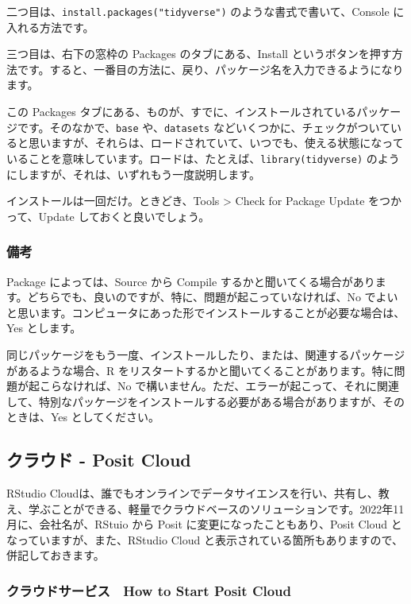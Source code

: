 \documentclass[
]{bxjsbook}
\theoremstyle{definition}
\theoremstyle{definition}
\theoremstyle{definition}
\theoremstyle{definition}
\theoremstyle{remark}
\begin{document}
二つ目は、\texttt{install.packages("tidyverse")} のような書式で書いて、Console に入れる方法です。

三つ目は、右下の窓枠の Packages のタブにある、Install というボタンを押す方法です。すると、一番目の方法に、戻り、パッケージ名を入力できるようになります。

この Packages タブにある、ものが、すでに、インストールされているパッケージです。そのなかで、\texttt{base} や、\texttt{datasets} などいくつかに、チェックがついていると思いますが、それらは、ロードされていて、いつでも、使える状態になっていることを意味しています。ロードは、たとえば、\texttt{library(tidyverse)} のようにしますが、それは、いずれもう一度説明します。

インストールは一回だけ。ときどき、Tools \textgreater{} Check for Package Update をつかって、Update しておくと良いでしょう。

\hypertarget{ux5099ux8003}{%
\subsubsection{備考}\label{ux5099ux8003}}

Package によっては、Source から Compile するかと聞いてくる場合があります。どちらでも、良いのですが、特に、問題が起こっていなければ、No でよいと思います。コンピュータにあった形でインストールすることが必要な場合は、Yes とします。

同じパッケージをもう一度、インストールしたり、または、関連するパッケージがあるような場合、R をリスタートするかと聞いてくることがあります。特に問題が起こらなければ、No で構いません。ただ、エラーが起こって、それに関連して、特別なパッケージをインストールする必要がある場合がありますが、そのときは、Yes としてください。

\hypertarget{ux30afux30e9ux30a6ux30c9---posit-cloud}{%
\subsection{クラウド - Posit Cloud}\label{ux30afux30e9ux30a6ux30c9---posit-cloud}}

RStudio Cloudは、誰でもオンラインでデータサイエンスを行い、共有し、教え、学ぶことができる、軽量でクラウドベースのソリューションです。2022年11月に、会社名が、RStuio から Posit に変更になったこともあり、Posit Cloud となっていますが、また、RStudio Cloud と表示されている箇所もありますので、併記しておきます。

\hypertarget{ux30afux30e9ux30a6ux30c9ux30b5ux30fcux30d3ux30b9-how-to-start-posit-cloud}{%
\subsubsection{クラウドサービス　How to Start Posit Cloud}\label{ux30afux30e9ux30a6ux30c9ux30b5ux30fcux30d3ux30b9-how-to-start-posit-cloud}}
\end{document}
